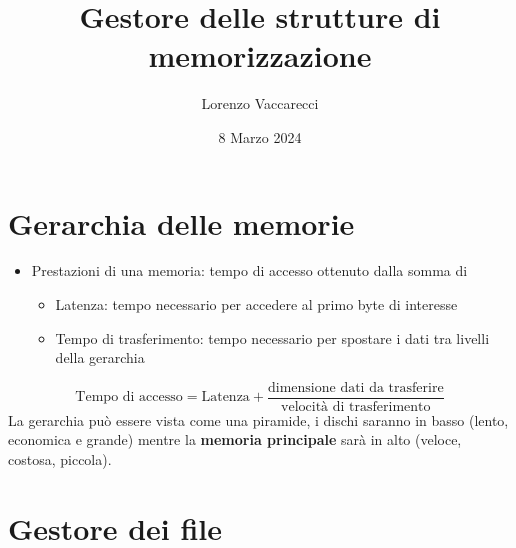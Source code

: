 \documentclass[12pt]{article}
\title{Gestore delle strutture di memorizzazione}
\author{Lorenzo Vaccarecci}
\date{8 Marzo 2024}
\begin{document}
\maketitle
\section{Gerarchia delle memorie}
\begin{itemize}
    \item Prestazioni di una memoria: tempo di accesso ottenuto dalla somma di \begin{itemize}
        \item Latenza: tempo necessario per accedere al primo byte di interesse
        \item Tempo di trasferimento: tempo necessario per spostare i dati tra livelli della gerarchia 
    \end{itemize}
\end{itemize}
\begin{equation*}
    \text{Tempo di accesso} = \text{Latenza} + \frac{\text{dimensione dati da trasferire}}{\text{velocità di trasferimento}}
\end{equation*}
La gerarchia può essere vista come una piramide, i dischi saranno in basso (lento, economica e grande) mentre la \textbf{memoria principale} sarà in alto (veloce, costosa, piccola).
\section{Gestore dei file}
\end{document}
